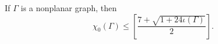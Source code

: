 If $\Gamma$ is a nonplanar graph, then
$$\chi_0(\Gamma) \leq \left[ \frac{7 + \sqrt{1 + 24\iota(\Gamma)}}{2} \right].$$
